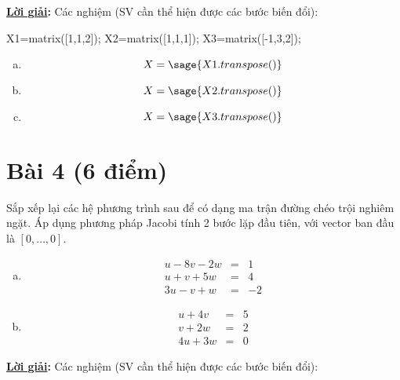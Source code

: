 \documentclass[12pt]{article}
\newcommand{\Solution}{
\medskip
{\bf \underline{Lời giải}:}
}
\begin{document}
\Solution Các nghiệm (SV cần thể hiện được các bước biến đổi):

\begin{sagesilent}
X1=matrix([1,1,2]);
X2=matrix([1,1,1]);
X3=matrix([-1,3,2]);
\end{sagesilent}

\begin{enumerate}[a)]
\item \begin{equation}
X=\sage{X1.transpose()}
\end{equation}

\item \begin{equation}
X=\sage{X2.transpose()}
\end{equation}

\item \begin{equation}
X=\sage{X3.transpose()}
\end{equation}

\end{enumerate}


\section{Bài 4 (6 điểm)}

Sắp xếp lại các hệ phương trình sau để có dạng ma trận đường chéo trội nghiêm ngặt. Áp dụng phương pháp Jacobi tính 2 bước lặp đầu tiên, với vector ban đầu là $[0,\ldots,0]$.

\begin{enumerate}[a)]

\item

  \begin{eqnarray*}
    u - 8v - 2w &=& 1\\
    u +  v + 5w &=& 4 \\
   3u -  v +  w &=& -2
  \end{eqnarray*}
    
\item  
 \begin{eqnarray*}
    u + 4v      &=& 5\\
         v + 2w &=& 2\\
    4u     + 3w &=& 0
  \end{eqnarray*}
  
\end{enumerate}

\Solution Các nghiệm (SV cần thể hiện được các bước biến đổi):
\end{document}
